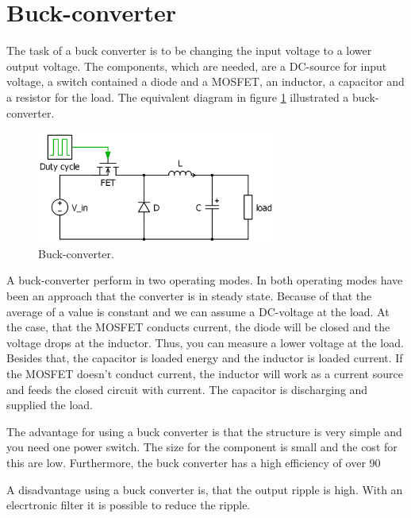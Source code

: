 \section{Buck-converter\label{Buck-C}}

The task of a buck converter is to be changing the input voltage to a lower output voltage. The components, which are needed, are a DC-source for input voltage, a switch contained a diode and a MOSFET, an inductor, a capacitor and a resistor for the load. The equivalent diagram in figure \ref{Buck-converter} illustrated a buck-converter.%

\begin{figure}[htbp]
	\begin{center}
		\includegraphics[width=0.7\textwidth]{../Pictures/Buck-converter}
		\caption{Buck-converter.}
		\label{Buck-converter}
	\end{center}	
\end{figure}

A buck-converter perform in two operating modes. In both operating modes have been an approach that the converter is in steady state. Because of that the average of a value is constant and we can assume a DC-voltage at the load. At the case, that the MOSFET conducts current, the diode will be closed and the voltage drops at the inductor. Thus,  you can measure a lower voltage at the load. Besides that, the capacitor is loaded energy and the inductor is loaded current. If the MOSFET doesn't conduct current, the inductor will work as a current source and feeds the closed circuit with current. The capacitor is discharging and supplied the load.

The advantage for using a buck converter is that the structure is very simple and you need one power switch. The size for the component is small and the cost for this are low. Furthermore, the buck converter has a high efficiency of over 90 %

A disadvantage using a buck converter is, that the output ripple is high. With an elecrtronic filter it is possible to reduce the ripple.


